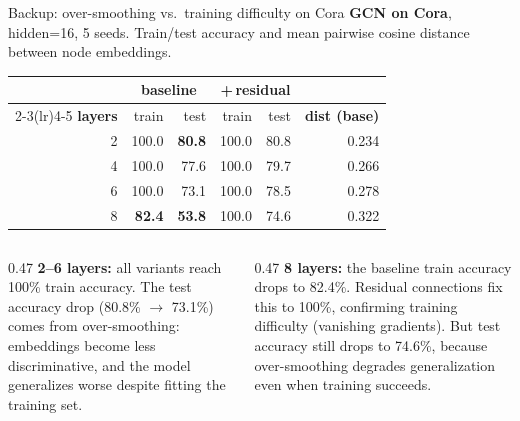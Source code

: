 \documentclass[aspectratio=169,11pt]{beamer}
\begin{document}
\appendix

\begin{frame}{Backup: over-smoothing vs.\ training difficulty on Cora}
  \vspace{-0.2em}
  \centering\scriptsize
  \textbf{GCN on Cora}, hidden=16, 5 seeds. Train/test accuracy and mean
  pairwise cosine distance between node embeddings.
  \vspace{0.2em}

  \begin{tabular}{@{}rrrrrr@{}}
    \toprule
    & \multicolumn{2}{c}{\textbf{baseline}} &
      \multicolumn{2}{c}{\textbf{+\,residual}} & \\
    \cmidrule(lr){2-3}\cmidrule(lr){4-5}
    \textbf{layers} & train & test & train & test & \textbf{dist (base)} \\
    \midrule
    2 & 100.0 & \textcolor{good}{\textbf{80.8}} & 100.0 & 80.8 & 0.234 \\
    4 & 100.0 & 77.6 & 100.0 & 79.7 & 0.266 \\
    6 & 100.0 & 73.1 & 100.0 & \textcolor{good}{78.5} & 0.278 \\
    8 & \textcolor{acc}{\textbf{82.4}} & \textcolor{acc}{\textbf{53.8}}
      & 100.0 & 74.6 & 0.322 \\
    \bottomrule
  \end{tabular}
  \vspace{0.4em}

  \small
  \begin{columns}[T]
    \begin{column}{0.47\textwidth}
      \textbf{2--6 layers:} all variants reach 100\% train accuracy.
      The test accuracy drop (80.8\% $\rightarrow$ 73.1\%) comes from
      \alert{over-smoothing}: embeddings become less discriminative, and the
      model generalizes worse despite fitting the training set.
    \end{column}
    \begin{column}{0.47\textwidth}
      \textbf{8 layers:} the baseline train accuracy drops to 82.4\%.
      \alert{Residual connections} fix this to 100\%, confirming training
      difficulty (vanishing gradients). But test accuracy still drops to
      74.6\%, because over-smoothing degrades generalization even when
      training succeeds.
    \end{column}
  \end{columns}
\end{frame}
\end{document}
